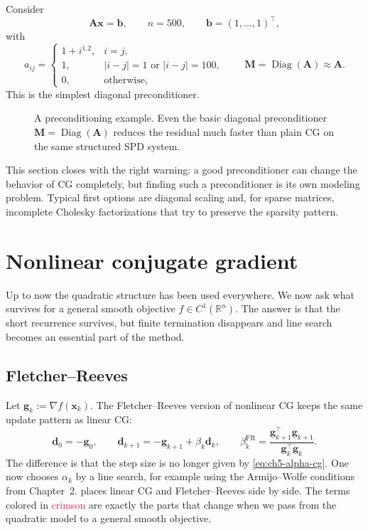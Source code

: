\begin{example}
Consider
\[
  \mathbf{A}\mathbf{x}=\mathbf{b},
  \qquad
  n=500,
  \qquad
  \mathbf{b}=(1,\ldots,1)^{\top},
\]
with
\[
  a_{ij}=
  \begin{cases}
    1+i^{1.2}, & i=j,\\
    1, & |i-j|=1 \text{ or } |i-j|=100,\\
    0, & \text{otherwise},
  \end{cases}
  \qquad
  \mathbf{M}=\operatorname{Diag}(\mathbf{A}) \approx \mathbf{A}.
\]
This is the simplest diagonal preconditioner.
\end{example}

\begin{figure}[ht]
  \centering
  \caption{A preconditioning example. Even the basic diagonal
  preconditioner $\mathbf{M}=\operatorname{Diag}(\mathbf{A})$ reduces the
  residual much faster than plain CG on the same structured SPD system.}
  \label{fig:ch5-pcg-example}
\end{figure}

This section closes with the right warning: a good preconditioner can
change the behavior of CG completely, but finding such a preconditioner is its
own modeling problem. Typical first options are diagonal scaling and, for
sparse matrices, incomplete Cholesky factorizations that try to preserve the
sparsity pattern.

\section{Nonlinear conjugate gradient}
\label{sec:ch5-nonlinear-cg}
Up to now the quadratic structure has been used everywhere. We now ask what
survives for a general smooth objective $f\in C^1(\mathbb{R}^n)$. The answer
is that the short recurrence survives, but
finite termination disappears and line search becomes an essential part of the
method.

\subsection{Fletcher--Reeves}
Let $\mathbf{g}_k:=\nabla f(\mathbf{x}_k)$. The Fletcher--Reeves version of
nonlinear CG keeps the same update pattern as linear CG:
\[
  \mathbf{d}_0=-\mathbf{g}_0,
  \qquad
  \mathbf{d}_{k+1}=-\mathbf{g}_{k+1}+\beta_k \mathbf{d}_k,
  \qquad
  \beta_k^{\mathrm{FR}}
  =\frac{\mathbf{g}_{k+1}^{\top}\mathbf{g}_{k+1}}
  {\mathbf{g}_k^{\top}\mathbf{g}_k}.
\]
The difference is that the step size is no longer given by
\eqref{eq:ch5-alpha-cg}. One now chooses $\alpha_k$ by a line search, for
example using the Armijo--Wolfe conditions from Chapter~2.
 places linear CG and Fletcher--Reeves side by
side. The terms colored in \textcolor{crimson}{crimson} are exactly the parts
that change when we pass from the quadratic model to a general smooth
objective.

